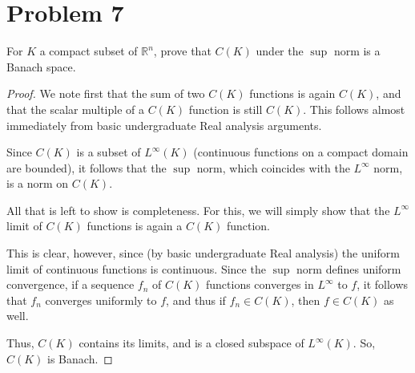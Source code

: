 \documentclass[fontsize=11pt]{scrartcl} %
\numberwithin{equation}{section} %
\numberwithin{figure}{section} %
\numberwithin{table}{section} %
\newcommand{\R}{\mathbb{R}}
\begin{document}
\section*{Problem 7}
For $K$ a compact subset of $\R^n$, prove that $C(K)$ under the $\sup$ norm is a
Banach space.
\\
\begin{proof}
    We note first that the sum of two $C(K)$ functions is again $C(K)$, and that
    the scalar multiple of a $C(K)$ function is still $C(K)$. This follows
    almost immediately from basic undergraduate Real analysis arguments.

    Since $C(K)$ is a subset of $L^{\infty}(K)$ (continuous functions on a
    compact domain are bounded), it follows that the $\sup$ norm, which
    coincides with the $L^{\infty}$ norm, is a norm on $C(K)$.

    All that is left to show is completeness. For this, we will simply show that
    the $L^{\infty}$ limit of $C(K)$ functions is again a $C(K)$ function.

    This is clear, however, since (by basic undergraduate Real analysis) the
    uniform limit of continuous functions is continuous. Since the $\sup$ norm
    defines uniform convergence, if a sequence $f_n$ of $C(K)$ functions
    converges in $L^{\infty}$ to $f$, it follows that $f_n$ converges uniformly
    to $f$, and thus if $f_n\in C(K)$, then $f\in C(K)$ as well.

    Thus, $C(K)$ contains its limits, and is a closed subspace of
    $L^{\infty}(K)$. So, $C(K)$ is Banach.
\end{proof}
\newpage
\end{document}
